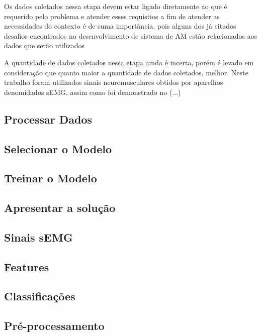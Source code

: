 Os dados coletados nessa etapa devem estar ligado diretamente ao que é requerido pelo problema e atender esses requisitos a fim de atender as necessidades do contexto é de suma importância, pois alguns dos já citados desafios encontrados no desenvolvimento de sistema de AM estão relacionados aos dados que serão utilizados \cite{geron2017hands}

A quantidade de dados coletados nessa etapa ainda é incerta, porém é levado em consideração que quanto maior a quantidade de dados coletados, melhor. Neste trabalho foram utilizados sinais neuromusculares obtidos por aparelhos denomidados sEMG, assim como foi demonstrado no (...)

\subsection{Processar Dados}

\subsection{Selecionar o Modelo}

\subsection{Treinar o Modelo}

\subsection{Apresentar a solução}

\subsection{Sinais sEMG}
\subsection{Features}
\subsection{Classificações}
\subsection{Pré-processamento}